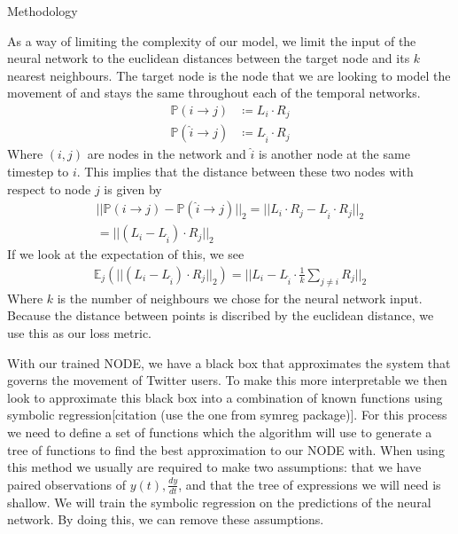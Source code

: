 \documentclass{article}
\begin{document}
\begin{section}{Methodology}
    
    As a way of limiting the complexity of our model, we limit the input of the neural network to the euclidean distances between the target node and its $k$ nearest neighbours. The target node is the node that we are looking to model the movement of and stays the same throughout each of the temporal networks. 
    \begin{align}
        \mathbb{P}(i\rightarrow j)&\coloneqq L_i \cdot R_j\\
        \mathbb{P}(\hat{i}\rightarrow j)&\coloneqq L_{\hat{i}} \cdot R_j
    \end{align}
    Where $(i,j)$ are nodes in the network and $\hat{i}$ is another node at the same timestep to $i$. This implies that the distance between these two nodes with respect to node $j$ is given by
    \begin{equation}
        \begin{gathered}
            ||\mathbb{P}(i\rightarrow j)-\mathbb{P}(\hat{i}\rightarrow j)||_2 = 
            ||L_i \cdot R_j-L_{\hat{i}} \cdot R_j||_2\\
            =||(L_i -L_{\hat{i}}) \cdot R_j||_2
        \end{gathered}
    \end{equation}
    If we look at the expectation of this, we see
    \begin{equation}
        \begin{gathered}
            \mathbb{E}_j(||(L_i -L_{\hat{i}}) \cdot R_j||_2) = ||L_i -L_{\hat{i}} \cdot \frac{1}{k}\sum_{j\ne i}R_j||_2
        \end{gathered}
    \end{equation}
    Where $k$ is the number of neighbours we chose for the neural network input. Because the distance between points is discribed by the euclidean distance, we use this as our loss metric.

    With our trained NODE, we have a black box that approximates the system that governs the movement of Twitter users. To make this more interpretable we then look to approximate this black box into a combination of known functions using symbolic regression[citation (use the one from symreg package)]. For this process we need to define a set of functions which the algorithm will use to generate a tree of functions to find the best approximation to our NODE with. When using this method we usually are required to make two assumptions: that we have paired observations of $y(t), \frac{dy}{dt}$, and that the tree of expressions we will need is shallow. We will train the symbolic regression on the predictions of the neural network. By doing this, we can remove these assumptions\cite{kidger2022neural}.
\end{section}
\end{document}
